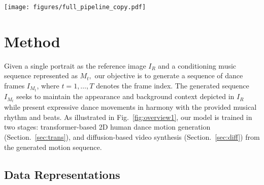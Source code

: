 \begin{figure*}[bt!]
\centering
\vspace{-2mm}
\texttt{[image: figures/full\_pipeline\_copy.pdf]}
\caption{\textbf{Overview of~\papername.} 
We propose a cross-conditional transformer model to autoregressively generate 2D human poses synchronized with input music, followed by a diffusion model that produces high-fidelity videos from a single reference image $I_R.$ First, we develop a multi-part compositional tokenization for 2D poses, encoding and quantizing each body part independently with keypoint confidence. These tokens are then merged into a whole-body, confidence-aware pose using a shared decoder. Next, we train a GPT-based transformer to autoregressively predict future pose tokens with causal attention, conditioned on past poses and aligned music embeddings. For global music style and motion context, we incorporate the entire music sequence and sampled prior poses. With a learnable motion decoder, we generate multi-scale spatial pose guidance upsampled from a learned feature map, incorporating the generated motion tokens within a temporal window (16 frames) using AdaIN. By co-training the motion decoder and temporal modules, our diffusion model is capable of synthesizing temporally smooth and high-fidelity video frames, while maintaining consistent appearance with the reference image with a trained reference net. }
\vspace{-3mm}
\label{fig:overview1}
\end{figure*}

\section{Method}
Given a single portrait as the reference image $I_R$ and a conditioning music sequence represented as ${M_t},$ our objective is to generate a sequence of dance frames ${I_{M_t}}$, where $t=1,…, T$ denotes the frame index. The generated sequence ${I_{M_t}}$ seeks to maintain the appearance and background context depicted in $I_R$ while present expressive dance movements in harmony with the provided musical rhythm and beats. As illustrated in Fig.~\ref{fig:overview1}, our model is trained in two stages: transformer-based 2D human dance motion generation (Section.~\ref{sec:trans}), and diffusion-based video synthesis (Section.~\ref{sec:diff}) from the generated motion sequence. 


\subsection{Data Representations} 
